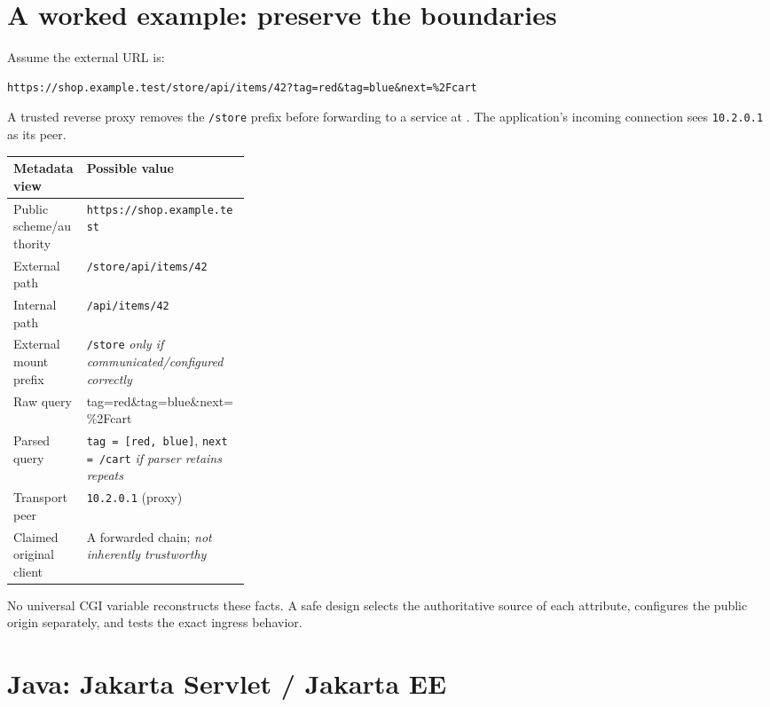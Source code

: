\documentclass[10pt,letterpaper,oneside]{article}
\newcommand{\code}[1]{\texttt{#1}}
\begin{document}
\section{A worked example: preserve the boundaries}
Assume the external URL is:
\begin{lstlisting}[language=Plain]
https://shop.example.test/store/api/items/42?tag=red&tag=blue&next=%2Fcart
\end{lstlisting}
A trusted reverse proxy removes the \code{/store} prefix before forwarding to a service at . The application's incoming connection sees \code{10.2.0.1} as its peer.

\smallskip
\noindent\begin{tabularx}{\linewidth}{P{0.31\linewidth}Y}
\toprule\textbf{Metadata view} & \textbf{Possible value}\\\midrule
Public scheme/authority & \code{https://shop.example.test}\\
External path & \code{/store/api/items/42}\\
Internal path & \code{/api/items/42}\\
External mount prefix & \code{/store} \emph{only if communicated/configured correctly}\\
Raw query & {\footnotesize\ttfamily tag=red\&tag=blue\&next=\%2Fcart}\\
Parsed query & \code{tag = [red, blue]}, \code{next = /cart} \emph{if parser retains repeats}\\
Transport peer & \code{10.2.0.1} (proxy)\\
Claimed original client & A forwarded chain; \emph{not inherently trustworthy}\\
\bottomrule
\end{tabularx}

No universal CGI variable reconstructs these facts. A safe design selects the authoritative source of each attribute, configures the public origin separately, and tests the exact ingress behavior.

\section{Java: Jakarta Servlet / Jakarta EE}
\end{document}
